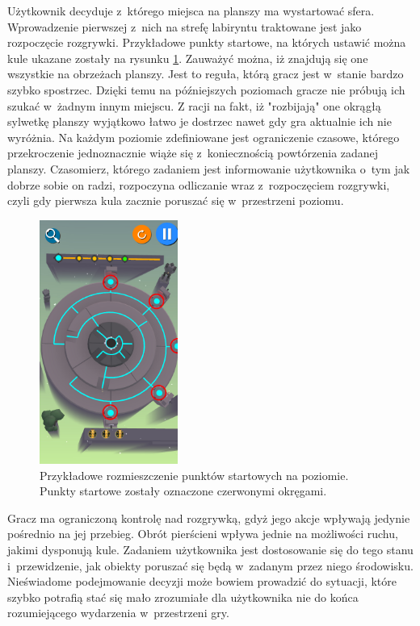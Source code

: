 \documentclass[a4paper,12pt,numbers=noenddot]{report}
\begin{document}
Użytkownik decyduje z~którego miejsca na planszy ma wystartować sfera. Wprowadzenie pierwszej z~nich na strefę labiryntu traktowane jest jako rozpoczęcie rozgrywki. Przykładowe punkty startowe, na których ustawić można kule ukazane zostały na rysunku \ref{fig:sphaze_startpoints_1}. Zauważyć można, iż znajdują się one wszystkie na obrzeżach planszy. Jest to reguła, którą gracz jest w~stanie bardzo szybko spostrzec. Dzięki temu na późniejszych poziomach gracze nie próbują ich szukać w~żadnym innym miejscu. Z racji na fakt, iż "rozbijają" one okrągłą sylwetkę planszy wyjątkowo łatwo je dostrzec nawet gdy gra aktualnie ich nie wyróżnia. 
Na każdym poziomie zdefiniowane jest ograniczenie czasowe, którego przekroczenie jednoznacznie wiąże się z~koniecznością powtórzenia zadanej planszy. Czasomierz, którego zadaniem jest informowanie użytkownika o~tym jak dobrze sobie on radzi, rozpoczyna odliczanie wraz z~rozpoczęciem rozgrywki, czyli gdy pierwsza kula zacznie poruszać się w~przestrzeni poziomu. 

\begin{figure}[h!]
	\centering
  	\includegraphics[height=8cm]{fig/start_points.jpg}
	\caption{Przykładowe rozmieszczenie punktów startowych na poziomie. Punkty startowe zostały oznaczone czerwonymi okręgami.}
	\label{fig:sphaze_startpoints_1}
\end{figure}

Gracz ma ograniczoną kontrolę nad rozgrywką, gdyż jego akcje wpływają jedynie pośrednio na jej przebieg. Obrót pierścieni wpływa jednie na możliwości ruchu, jakimi dysponują kule. Zadaniem użytkownika jest dostosowanie się do tego stanu i~przewidzenie, jak obiekty poruszać się będą w~zadanym przez niego środowisku. Nieświadome podejmowanie decyzji może bowiem prowadzić do sytuacji, które szybko potrafią stać się mało zrozumiałe dla użytkownika nie do końca rozumiejącego wydarzenia w~przestrzeni gry.
\end{document}
